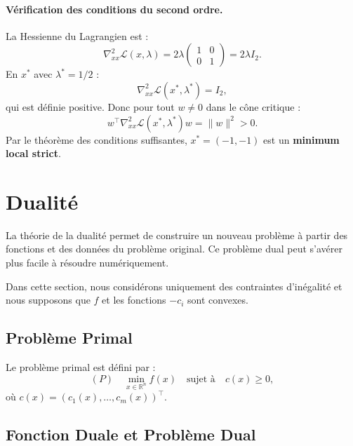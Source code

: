 \begin{exemple}
    \paragraph{Vérification des conditions du second ordre.}
    La Hessienne du Lagrangien est :
    \begin{equation}
        \nabla_{xx}^2 \mathcal{L}(x, \lambda) = 2\lambda \begin{pmatrix} 1 & 0 \\ 0 & 1 \end{pmatrix} = 2\lambda I_2.
    \end{equation}
    En $x^*$ avec $\lambda^* = 1/2$ :
    \begin{equation}
        \nabla_{xx}^2 \mathcal{L}(x^*, \lambda^*) = I_2,
    \end{equation}
    qui est définie positive. Donc pour tout $w \neq 0$ dans le cône critique :
    \begin{equation}
        w^\top \nabla_{xx}^2 \mathcal{L}(x^*, \lambda^*) w = \|w\|^2 > 0.
    \end{equation}
    Par le théorème des conditions suffisantes, $x^* = (-1, -1)$ est un \textbf{minimum local strict}.
\end{exemple}

\section{Dualité}

La théorie de la dualité permet de construire un nouveau problème à partir des fonctions et des données du problème original. Ce problème dual peut s'avérer plus facile à résoudre numériquement.

Dans cette section, nous considérons uniquement des contraintes d'inégalité et nous supposons que $f$ et les fonctions $-c_i$ sont convexes.

\subsection{Problème Primal}

Le problème primal est défini par :
\begin{equation}
    (P) \quad \min_{x \in \mathbb{R}^n} f(x) \quad \text{sujet à} \quad c(x) \geq 0,
\end{equation}
où $c(x) = (c_1(x), \dots, c_m(x))^\top$.

\subsection{Fonction Duale et Problème Dual}

